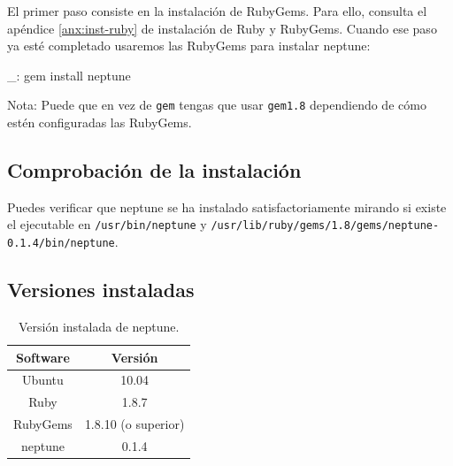 El primer paso consiste en la instalación de RubyGems. Para ello, consulta el apéndice \ref{anx:inst-ruby} de instalación de Ruby y RubyGems. Cuando ese paso ya esté completado usaremos las RubyGems para instalar neptune:

\begin{bashcode}
_: gem install neptune
\end{bashcode}

Nota: Puede que en vez de \texttt{gem} tengas que usar \texttt{gem1.8} dependiendo de cómo estén configuradas las RubyGems.


\subsection{Comprobación de la instalación}

Puedes verificar que neptune se ha instalado satisfactoriamente mirando si existe el ejecutable en \texttt{/usr/bin/neptune} y \texttt{/usr/lib/ruby/gems/1.8/gems/neptune-0.1.4/bin/neptune}.


\subsection{Versiones instaladas}

\begin{table}[!htbp]
\centering
   \begin{tabular}{|c|c|}
      \hline
      \textbf{Software} & \textbf{Versión} \\ \hline
      Ubuntu & 10.04 \\ \hline
      Ruby & 1.8.7 \\ \hline
      RubyGems & 1.8.10 (o superior) \\ \hline
      neptune & 0.1.4 \\ \hline
   \end{tabular}
\caption{Versión instalada de neptune.}
\label{table:neptune-versions}
\end{table}
